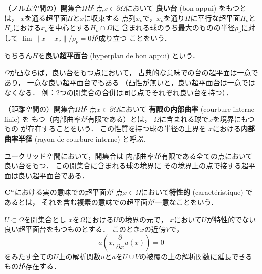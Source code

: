 \begin{DFN}
    （ノルム空間の）開集合\(\Omega\)が
    点\(x\in\partial\Omega\)において
    \textbf{良い台} (bon appui) をもつとは，
    \(x\)を通る超平面\(H\)と\(x\)に収束する
    点列\(x_\nu\)で，\(x_\nu\)を通り\(H\)に平行な超平面\(H_\nu\)と
    \(H_\nu\)における\(x_\nu\)を中心とする\(H_\nu\cap\Omega\)に
    含まれる球のうち最大のものの半径\(\rho_\nu\)に対して
    \(\lim\lVert x-x_\nu\rVert/\rho_\nu=0\)が成り立つ
    ことをいう．

    もちろん\(H\)を\textbf{良い超平面台} 
    (hyperplan de bon appui) という．
\end{DFN}
\begin{CMT}
    \(\Omega\)が凸ならば，良い台をもつ点において，
    古典的な意味での台の超平面は一意であり，
    一意な良い超平面台でもある
    （凸性が無いと，良い超平面台は一意ではなくなる．
    例：2つの開集合の合併は同じ点でそれぞれ良い台を持つ）．
\end{CMT}
\begin{DFN}
    （距離空間の）開集合\(\Omega\)が
    点\(x\in\partial\Omega\)において
    \textbf{有限の内部曲率} (courbure interne finie) を
    もつ（内部曲率が有限である）とは，
    \(\Omega\)に含まれる球で\(x\)を境界にもつもの
    が存在することをいう．
    この性質を持つ球の半径の上界を
    \(x\)における\textbf{内部曲率半径} 
    (rayon de courbure interne) と呼ぶ.
\end{DFN}
\begin{CMT}
    ユークリッド空間において，開集合は
    内部曲率が有限である全ての点において良い台をもつ．
    この開集合に含まれる球の境界に
    その境界上の点で接する超平面は良い超平面台である．
\end{CMT}
\begin{DFN}
    \(\mathbf{C}^n\)における実の意味での超平面が
    点\(x\in\Omega\)において\textbf{特性的} 
    (caract\'eristique) であるとは，
    それを含む複素の意味での超平面が一意なことをいう．
\end{DFN}
\begin{PRP}
    \(U\subset\Omega\)を開集合とし
    \(x\)を\(\Omega\)における\(U\)の境界の元で，
    \(x\)において\(U\)が特性的でない良い超平面台をもつものとする．    
    このとき\(x\)の近傍\(V\)で，
    \begin{equation}\label{eq:Zer1}
        a\left(x,\frac{\partial}{\partial x}u(x)\right)=0
    \end{equation}
    をみたす全ての\(U\)上の解析関数\(u\)と\(a\)を\(U\cup V\)の被覆の上の解析関数に延長できる
    ものが存在する．
\end{PRP}
